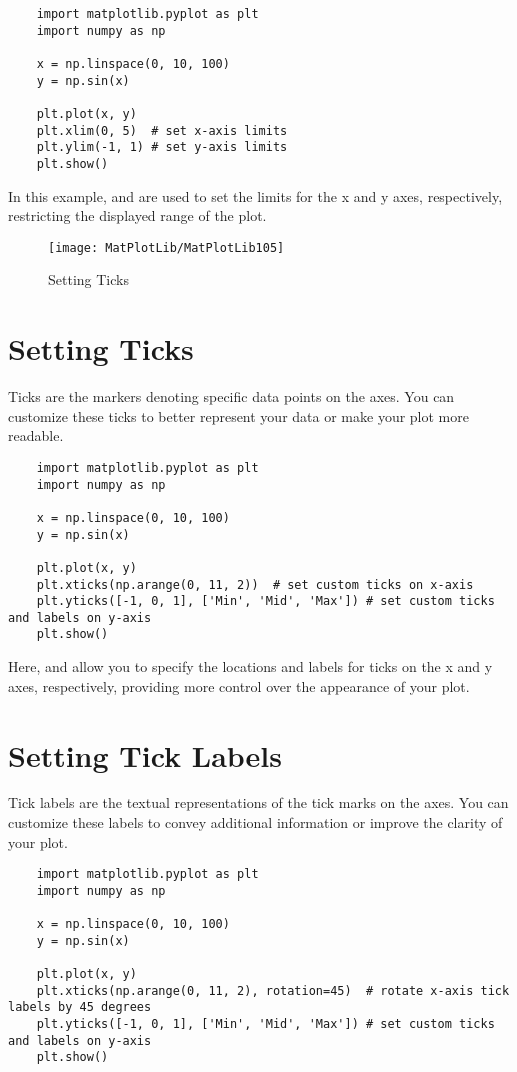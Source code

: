 \begin{lstlisting}
	import matplotlib.pyplot as plt
	import numpy as np
	
	x = np.linspace(0, 10, 100)
	y = np.sin(x)
	
	plt.plot(x, y)
	plt.xlim(0, 5)  # set x-axis limits
	plt.ylim(-1, 1) # set y-axis limits
	plt.show()
\end{lstlisting}

In this example,  and  are used to set the limits for the x and y axes, respectively, restricting the displayed range of the plot.

\begin{figure}[h]
	\centering
	\texttt{[image: MatPlotLib/MatPlotLib105]}
	\caption{Setting Ticks}\label{Matplotlib05}
\end{figure}

\section*{Setting Ticks}

Ticks are the markers denoting specific data points on the axes. You can customize these ticks to better represent your data or make your plot more readable.

\begin{lstlisting}
	import matplotlib.pyplot as plt
	import numpy as np
	
	x = np.linspace(0, 10, 100)
	y = np.sin(x)
	
	plt.plot(x, y)
	plt.xticks(np.arange(0, 11, 2))  # set custom ticks on x-axis
	plt.yticks([-1, 0, 1], ['Min', 'Mid', 'Max']) # set custom ticks and labels on y-axis
	plt.show()
\end{lstlisting}

Here,  and  allow you to specify the locations and labels for ticks on the x and y axes, respectively, providing more control over the appearance of your plot.

\section*{Setting Tick Labels}

Tick labels are the textual representations of the tick marks on the axes. You can customize these labels to convey additional information or improve the clarity of your plot.

\begin{lstlisting}
	import matplotlib.pyplot as plt
	import numpy as np
	
	x = np.linspace(0, 10, 100)
	y = np.sin(x)
	
	plt.plot(x, y)
	plt.xticks(np.arange(0, 11, 2), rotation=45)  # rotate x-axis tick labels by 45 degrees
	plt.yticks([-1, 0, 1], ['Min', 'Mid', 'Max']) # set custom ticks and labels on y-axis
	plt.show()
\end{lstlisting}

